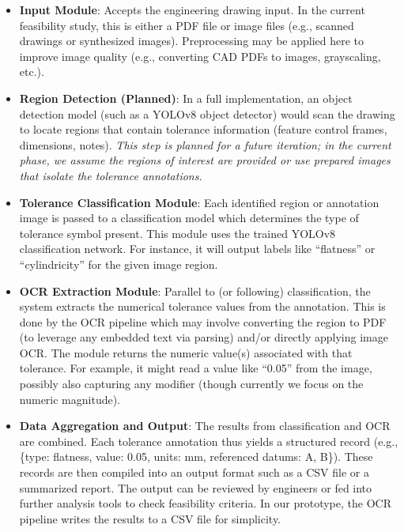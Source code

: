 \documentclass[11pt,a4paper]{article}
\begin{document}
\begin{itemize}
  \item \textbf{Input Module}: Accepts the engineering drawing input. In the current feasibility study, this is either a PDF file or image files (e.g., scanned drawings or synthesized images). Preprocessing may be applied here to improve image quality (e.g., converting CAD PDFs to images, grayscaling, etc.).
  \item \textbf{Region Detection (Planned)}: In a full implementation, an object detection model (such as a YOLOv8 object detector) would scan the drawing to locate regions that contain tolerance information (feature control frames, dimensions, notes). \emph{This step is planned for a future iteration; in the current phase, we assume the regions of interest are provided or use prepared images that isolate the tolerance annotations.}
  \item \textbf{Tolerance Classification Module}: Each identified region or annotation image is passed to a classification model which determines the type of tolerance symbol present. This module uses the trained YOLOv8 classification network. For instance, it will output labels like “flatness” or “cylindricity” for the given image region.
  \item \textbf{OCR Extraction Module}: Parallel to (or following) classification, the system extracts the numerical tolerance values from the annotation. This is done by the OCR pipeline which may involve converting the region to PDF (to leverage any embedded text via parsing) and/or directly applying image OCR. The module returns the numeric value(s) associated with that tolerance. For example, it might read a value like “0.05” from the image, possibly also capturing any modifier (though currently we focus on the numeric magnitude).
  \item \textbf{Data Aggregation and Output}: The results from classification and OCR are combined. Each tolerance annotation thus yields a structured record (e.g., \{type: flatness, value: 0.05, units: mm, referenced datums: A, B\}). These records are then compiled into an output format such as a CSV file or a summarized report. The output can be reviewed by engineers or fed into further analysis tools to check feasibility criteria. In our prototype, the OCR pipeline writes the results to a CSV file for simplicity.
\end{itemize}

\end{document}
